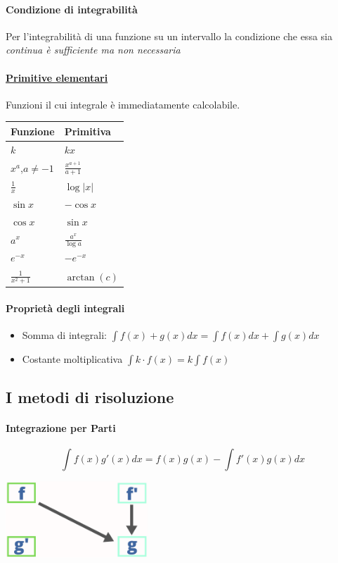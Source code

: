 \documentclass[12pt, a4paper, openany]{book}
\begin{document}
\paragraph*{Condizione di integrabilità} Per l'integrabilità di una funzione su un intervallo la condizione
che essa sia \emph{continua è sufficiente ma non necessaria}
\begin{multicols}{3}
	\paragraph*{\underline{Primitive elementari}}
	Funzioni il cui integrale è immediatamente calcolabile.
	\columnbreak
	\begin{tabularx}{0.7\textwidth}{ |Y|Y| }
		\hline
		\textbf{Funzione} & \textbf{Primitiva}    \\
		\hline
		$k$               & $kx$                  \\
		$x^a$,$a\neq-1$   & $\frac{x^{a+1}}{a+1}$ \\
		$\frac{1}{x}$     & $\log|x|$             \\
		$\sin x$          & $-\cos x$             \\
		$\cos x $         & $\sin x$              \\
		$a^x$             & $\frac{a^x}{\log a}$  \\
		\hline
		$e^{-x}$          & $-e^{-x}$             \\
		$\frac{1}{x^2+1}$ & $\arctan (c)$         \\
		\hline
	\end{tabularx}
\end{multicols}

\paragraph*{Proprietà degli integrali}
\begin{itemize}
	\item Somma di integrali: $\int f(x)+g(x) dx = \int f(x) dx + \int g(x) dx$
	\item Costante moltiplicativa $\int k \cdot f(x) = k \int f(x)$
\end{itemize}
\subsection*{I metodi di risoluzione}
\paragraph*{Integrazione per Parti}
$$\int f(x)g'(x)dx = f(x)g(x)-\int f'(x)g(x)dx$$
\begin{center}
	\includegraphics[width=0.4\textwidth]{integrazione-per-parti.png}
\end{center}
\end{document}
